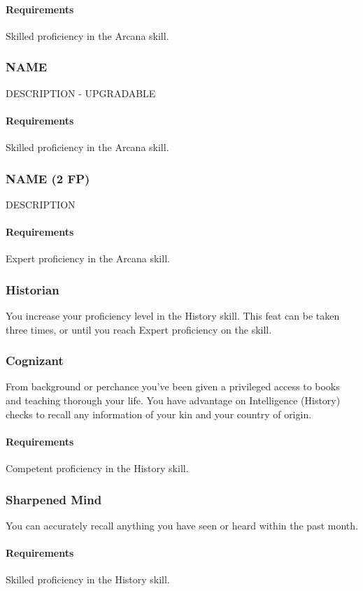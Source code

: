     \paragraph{Requirements} Skilled proficiency in the Arcana skill.
\subsubsection{NAME} \label{feat::name}
    DESCRIPTION - UPGRADABLE
    \paragraph{Requirements} Skilled proficiency in the Arcana skill.
\subsubsection{NAME (2 FP)} \label{feat::name}
    DESCRIPTION
    \paragraph{Requirements} Expert proficiency in the Arcana skill.
\subsubsection{Historian} \label{feat::historian}
    You increase your proficiency level in the History skill.
    This feat can be taken three times, or until you reach Expert proficiency on the skill.
\subsubsection{Cognizant} \label{feat::cognizant}
    From background or perchance you've been given a privileged access to books and teaching thorough your life.
    You have advantage on Intelligence (History) checks to recall any information of your kin and your country of origin.
    \paragraph{Requirements} Competent proficiency in the History skill.
\subsubsection{Sharpened Mind} \label{feat::sharpenedmind}
    You can accurately recall anything you have seen or heard within the past month.
    \paragraph{Requirements} Skilled proficiency in the History skill.
